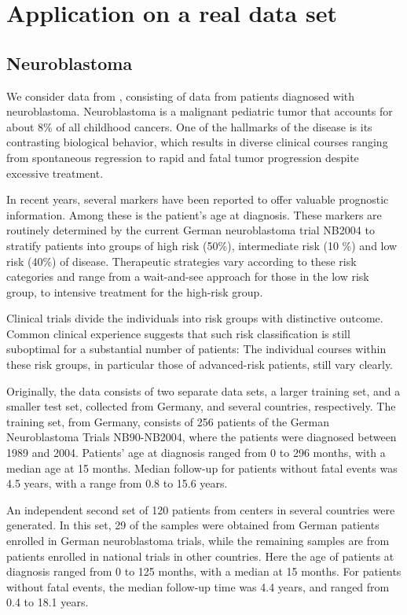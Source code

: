 \chapter{Application on a real data set}

\section{Neuroblastoma}
We consider data from \citet{oberthuer-data}, consisting of data from patients diagnosed with neuroblastoma.
Neuroblastoma is a malignant pediatric tumor that accounts for about 8\% of all childhood cancers.
One of the hallmarks of the disease is its contrasting biological behavior, which results in diverse clinical courses ranging from spontaneous regression to rapid and fatal tumor progression despite excessive treatment.

In recent years, several markers have been reported to offer valuable prognostic information.
Among these is the patient's age at diagnosis.
These markers are routinely determined by the current German neuroblastoma trial NB2004 to stratify patients into groups of high risk (50\%),
intermediate risk (10 \%) and low risk (40\%) of disease.
Therapeutic strategies vary according to these risk categories and range from a wait-and-see approach for those in the low risk group,
to intensive treatment for the high-risk group.

Clinical trials divide the individuals into risk groups with distinctive outcome.
Common clinical experience suggests that such risk classification is still suboptimal for a substantial number of patients:
The individual courses within these risk groups,
in particular those of advanced-risk patients, still vary clearly.

Originally, the data consists of two separate data sets, a larger training set, and a smaller test set, collected from Germany, and several countries, respectively.
The training set, from Germany, consists of 256 patients of the German Neuroblastoma Trials NB90-NB2004, where the patients were diagnosed between 1989 and 2004.
Patients' age at diagnosis ranged from 0 to 296 months, with a median age at 15 months.
Median follow-up for patients without fatal events was 4.5 years, with a range from 0.8 to 15.6 years.

An independent second set of 120 patients from centers in several countries were generated.
In this set, 29 of the samples were obtained from German patients enrolled in German neuroblastoma trials, while the remaining samples are from patients enrolled in national trials in other countries.
Here the age of patients at diagnosis ranged from 0 to 125 months, with a median at 15 months.
For patients without fatal events, the median follow-up time was 4.4 years, and ranged from 0.4 to 18.1 years.

